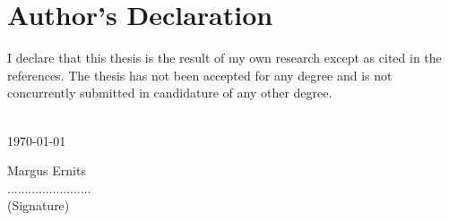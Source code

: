 \clearpage
\chapter*{Author’s Declaration}
\label{declaration}
\thispagestyle{empty}

I declare that this thesis is the result of my own research except as cited in the references. 
The thesis has not been accepted for any degree and is not concurrently submitted in candidature 
of any other degree.
\\
[2cm]\\

\begin{minipage}{0.5\textwidth}
	\begin{flushleft}
	\today \\
	\end{flushleft}
\end{minipage}
\begin{minipage}{0.5\textwidth}
	\begin{flushright}
	Margus Ernits \\
	........................ \\
	(Signature) 
	\end{flushright}
\end{minipage}
